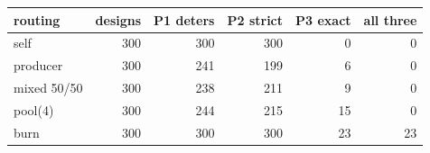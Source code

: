 \begin{tabular}{|l|r|r|r|r|r|}
\hline
\rowcolor{gray!15}routing & designs & P1 deters & P2 strict & P3 exact & all three \\
\hline
self & 300 & 300 & 300 & 0 & 0 \\
\hline
producer & 300 & 241 & 199 & 6 & 0 \\
\hline
mixed 50/50 & 300 & 238 & 211 & 9 & 0 \\
\hline
pool(4) & 300 & 244 & 215 & 15 & 0 \\
\hline
burn & 300 & 300 & 300 & 23 & 23 \\
\hline
\end{tabular}
